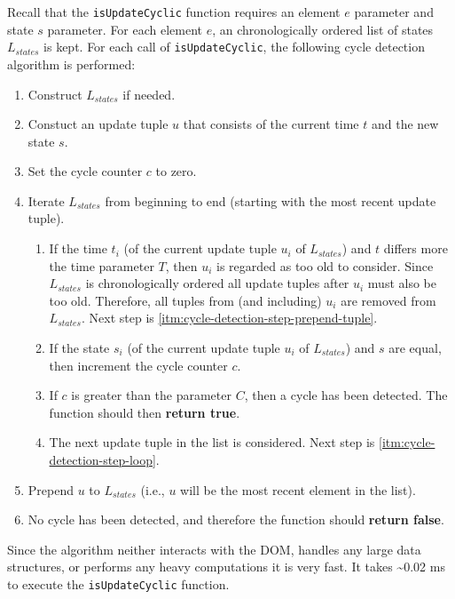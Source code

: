 \documentclass[a4paper,11pt]{kth-mag}
\newcommand{\code}[1]{\texttt{#1}}
\begin{document}
      Recall that the \code{isUpdateCyclic} function requires an element $e$ parameter and state $s$ parameter.
      For each element $e$, an chronologically ordered list of states $L_{states}$ is kept.
      For each call of \code{isUpdateCyclic}, the following cycle detection algorithm is performed:
      \begin{enumerate}
        \item Construct $L_{states}$ if needed.
        \item Constuct an update tuple $u$ that consists of the current time $t$ and the new state $s$.
        \item Set the cycle counter $c$ to zero.
        \item Iterate $L_{states}$ from beginning to end (starting with the most recent update tuple).
        \begin{enumerate}
          \item\label{itm:cycle-detection-step-loop}
            If the time $t_i$ (of the current update tuple $u_i$ of $L_{states}$) and $t$ differs more the time parameter $T$, then $u_i$ is regarded as too old to consider.
            Since $L_{states}$ is chronologically ordered all update tuples after $u_i$ must also be too old.
            Therefore, all tuples from (and including) $u_i$ are removed from $L_{states}$. Next step is \ref{itm:cycle-detection-step-prepend-tuple}.
          \item If the state $s_i$ (of the current update tuple $u_i$ of $L_{states}$) and $s$ are equal, then increment the cycle counter $c$.
          \item If $c$ is greater than the parameter $C$, then a cycle has been detected. The function should then \textbf{return true}.
          \item The next update tuple in the list is considered. Next step is \ref{itm:cycle-detection-step-loop}.
        \end{enumerate}
        \item\label{itm:cycle-detection-step-prepend-tuple} Prepend $u$ to $L_{states}$ (i.e., $u$ will be the most recent element in the list).
        \item No cycle has been detected, and therefore the function should \textbf{return false}.
      \end{enumerate}
      Since the algorithm neither interacts with the \gls{DOM}, handles any large data structures, or performs any heavy computations it is very fast.
      It takes \textasciitilde0.02 ms to execute the \code{isUpdateCyclic} function.
\end{document}
